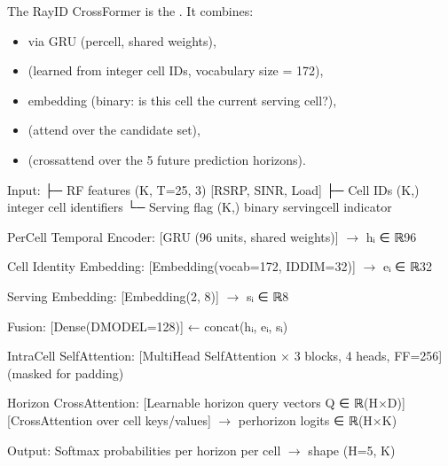 \documentclass[letterpaper,10pt,english]{sphinxmanual}
\begin{document}
\sphinxAtStartPar
The Ray\sphinxhyphen{}ID CrossFormer is the . It combines:
\begin{itemize}
\item {} 
\sphinxAtStartPar
{} via GRU (per\sphinxhyphen{}cell, shared weights),

\item {} 
\sphinxAtStartPar
{} (learned from integer cell IDs, vocabulary size = 172),

\item {} 
\sphinxAtStartPar
{} embedding (binary: is this cell the current serving cell?),

\item {} 
\sphinxAtStartPar
{} (attend over the candidate set),

\item {} 
\sphinxAtStartPar
{} (cross\sphinxhyphen{}attend over the 5 future prediction horizons).

\end{itemize}

\begin{sphinxVerbatim}[commandchars=\\\{\}]
Input:
  ├─ RF features   (K, T=25, 3)   [RSRP, SINR, Load]
  ├─ Cell IDs      (K,)            integer cell identifiers
  └─ Serving flag  (K,)            binary serving\PYGZhy{}cell indicator

Per\PYGZhy{}Cell Temporal Encoder:
  [GRU (96 units, shared weights)] \(\rightarrow\) hᵢ ∈ ℝ\PYGZca{}96

Cell Identity Embedding:
  [Embedding(vocab=172, ID\PYGZus{}DIM=32)] \(\rightarrow\) eᵢ ∈ ℝ\PYGZca{}32

Serving Embedding:
  [Embedding(2, 8)] \(\rightarrow\) sᵢ ∈ ℝ\PYGZca{}8

Fusion:
  [Dense(D\PYGZus{}MODEL=128)] ← concat(hᵢ, eᵢ, sᵢ)

Intra\PYGZhy{}Cell Self\PYGZhy{}Attention:
  [Multi\PYGZhy{}Head Self\PYGZhy{}Attention × 3 blocks, 4 heads, FF=256]  (masked for padding)

Horizon Cross\PYGZhy{}Attention:
  [Learnable horizon query vectors Q ∈ ℝ\PYGZca{}(H×D)]
  [Cross\PYGZhy{}Attention over cell keys/values]
  \(\rightarrow\) per\PYGZhy{}horizon logits ∈ ℝ\PYGZca{}(H×K)

Output:
  Softmax probabilities per horizon per cell  \(\rightarrow\)  shape (H=5, K)
\end{sphinxVerbatim}
\end{document}
